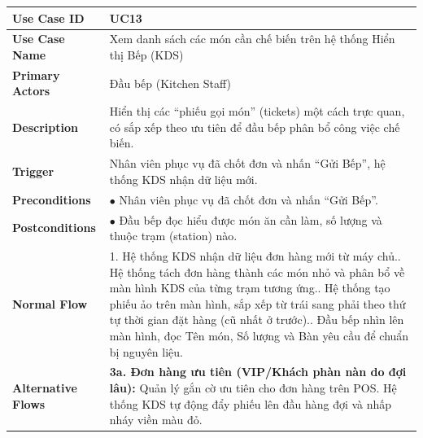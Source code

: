 \begin{longtable}{|L{3.5cm}|L{12.5cm}|}
\hline
\textbf{Use Case ID} & UC13 \\ \hline
\textbf{Use Case Name} & Xem danh sách các món cần chế biến trên hệ thống Hiển thị Bếp (KDS) \\ \hline
\textbf{Primary Actors} & Đầu bếp (Kitchen Staff) \\ \hline
\textbf{Description} & Hiển thị các ``phiếu gọi món'' (tickets) một cách trực quan, có sắp xếp theo ưu tiên để đầu bếp phân bổ công việc chế biến. \\ \hline
\textbf{Trigger} & Nhân viên phục vụ đã chốt đơn và nhấn ``Gửi Bếp'', hệ thống KDS nhận dữ liệu mới. \\ \hline
\textbf{Preconditions} & $\bullet$ Nhân viên phục vụ đã chốt đơn và nhấn ``Gửi Bếp''. \\ \hline
\textbf{Postconditions} & $\bullet$ Đầu bếp đọc hiểu được món ăn cần làm, số lượng và thuộc trạm (station) nào. \\ \hline
\textbf{Normal Flow} &
1. Hệ thống KDS nhận dữ liệu đơn hàng mới từ máy chủ.. Hệ thống tách đơn hàng thành các món nhỏ và phân bổ về màn hình KDS của từng trạm tương ứng.. Hệ thống tạo phiếu ảo trên màn hình, sắp xếp từ trái sang phải theo thứ tự thời gian đặt hàng (cũ nhất ở trước).. Đầu bếp nhìn lên màn hình, đọc Tên món, Số lượng và Bàn yêu cầu để chuẩn bị nguyên liệu. \\ \hline
\textbf{Alternative Flows} &
\textbf{3a. Đơn hàng ưu tiên (VIP/Khách phàn nàn do đợi lâu):} Quản lý gắn cờ ưu tiên cho đơn hàng trên POS. Hệ thống KDS tự động đẩy phiếu lên đầu hàng đợi và nhấp nháy viền màu đỏ. \\ \hline
\end{longtable}

